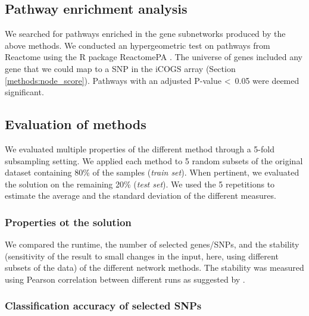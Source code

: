 \documentclass[twocolumn, 11pt]{article}
\begin{document}
\subsection{Pathway enrichment analysis}
\label{methods:pathway_enrichment}

We searched for pathways enriched in the gene subnetworks produced by the above methods. We conducted an hypergeometric test on pathways from Reactome \cite{Jassal2019} using the R package ReactomePA \cite{Yu2016}. The universe of genes included any gene that we could map to a SNP in the iCOGS array (Section \ref{methods:node_score}). Pathways with an adjusted P-value \textless~0.05 were deemed significant.

\subsection{Evaluation of methods}
\label{methods:comparison}

We evaluated multiple properties of the different method through a 5-fold subsampling setting. We applied each method to 5 random subsets of the original dataset containing 80\% of the samples (\emph{train set}). When pertinent, we evaluated the solution on the remaining 20\% (\emph{test set}). We used the 5 repetitions to estimate the average and the standard deviation of the different measures.

\subsubsection{Properties ot the solution}
\label{methods:algorithm_comparison}

We compared the runtime, the number of selected genes/SNPs, and the stability (sensitivity of the result to small changes in the input, here, using different subsets of the data) of the different network methods. The stability was measured using Pearson correlation between different runs as suggested by \citet{nogueira_measuring_2016}.

\subsubsection{Classification accuracy of selected SNPs}
\label{methods:classifier}
\end{document}
